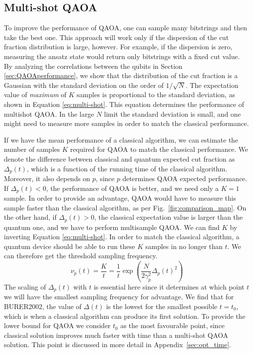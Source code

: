 \subsection{Multi-shot QAOA}

To improve the performance of QAOA, one can sample many bitstrings and then take the best one. This approach will  work only  if the  dispersion of the cut fraction distribution is large, however. For example, if the  dispersion is zero, measuring the ansatz state would return only bitstrings with a fixed cut value. By analyzing the correlations between the qubits in Section \ref{sec:QAOAperformance}, we show that the distribution of the cut fraction is a Gaussian with the  standard deviation on the order of $1/\sqrt N$. The expectation value of \emph{maximum} of $K$ samples is proportional to the  standard deviation, as shown in Equation \ref{eq:multi-shot}. This equation determines the performance of multishot QAOA. In the large $N$ limit the  standard deviation is small, and one might need to measure more samples in order to match the classical performance.



If we have the mean performance of a classical algorithm, we can estimate the number of samples $K$ required for QAOA to match the classical performance. We denote the difference between classical and quantum expected cut fraction as $\Delta_p(t)$, which is a function of the running time of the classical algorithm. Moreover, it also depends on $p$, since $p$ determines QAOA expected performance. If $\Delta_p(t) < 0$, the performance of QAOA is better, and we  need only a $K=1$ sample. In order to provide an advantage, QAOA would have to measure this sample faster than the classical algorithm, as per Fig.~\ref{fig:comparison_map}. On the other hand, if $\Delta_p(t) > 0$, the classical expectation value is larger than the quantum one, and we have to perform multisample QAOA. We can find $K$ by inverting Equation \ref{eq:multi-shot}. In order to match the classical algorithm, a quantum device should be able to run these $K$ samples in no longer than $t$. We can therefore get the threshold sampling frequency.
\begin{equation}
   \nu_p(t) = \frac{K}{t} = \frac{1}{t}\exp \left({\frac{N}{2\gamma_p^2}\Delta_p(t) ^2} \right)
\end{equation}
The scaling of $\Delta_p(t)$ with $t$ is essential here since it determines at which point $t$ we will have the smallest sampling frequency for advantage. We find that for BURER2002, the value of $\Delta(t)$ is the lowest for the smallest possible $t=t_0$, which is when a classical algorithm can produce its first solution. To provide the lower bound for QAOA we consider $t_0$ as the most favourable point, since classical solution improves much faster with time than a multi-shot QAOA solution. This point is discussed in more detail in Appendix~\ref{sec:opt_time}.



